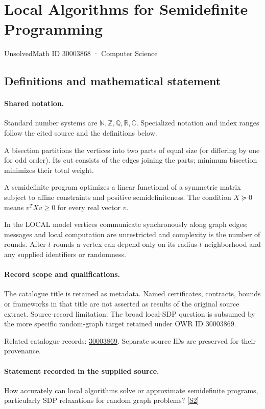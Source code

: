 \documentclass[11pt]{article}
\newcommand{\sref}[2]{\hyperlink{source:#1:#2}{[S#2]}}
\begin{document}
\setcounter{section}{30003867}
\section{Local Algorithms for Semidefinite Programming}\label{30003868}
{\small\sffamily UnsolvedMath ID 30003868 · Computer Science}
\subsection{Definitions and mathematical statement}

\paragraph{Shared notation.}Standard number systems are $\mathbb N,\mathbb Z,\mathbb Q,\mathbb R,\mathbb C$. Specialized notation and index ranges follow the cited source and the definitions below.


A bisection partitions the vertices into two parts of equal size (or differing by one for odd order). Its cut consists of the edges joining the parts; minimum bisection minimizes their total weight.

A semidefinite program optimizes a linear functional of a symmetric matrix subject to affine constraints and positive semidefiniteness. The condition $X\succeq0$ means $v^TXv\geq0$ for every real vector $v$.

In the LOCAL model vertices communicate synchronously along graph edges; messages and local computation are unrestricted and complexity is the number of rounds. After $t$ rounds a vertex can depend only on its radius-$t$ neighborhood and any supplied identifiers or randomness.
\paragraph{Record scope and qualifications.}
The catalogue title is retained as metadata. Named certificates, contracts, bounds or frameworks in that title are not asserted as results of the original source extract.
Source-record limitation: The broad local-SDP question is subsumed by the more specific random-graph target retained under OWR ID 30003869.

Related catalogue records: \href{https://mehmetmars7.github.io/Erdosproblems-llm-hunter/problem.html?type=open_problems&id=30003869}{30003869}. Separate source IDs are preserved for their provenance.
\paragraph{Statement recorded in the supplied source.}
How accurately can local algorithms solve or approximate semidefinite programs, particularly SDP relaxations for random graph problems? \sref{30003868}{2}
\end{document}
